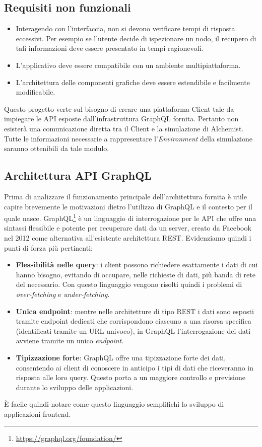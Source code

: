 \subsection{Requisiti non funzionali}
\begin{itemize}
	\item Interagendo con l'interfaccia, non si devono verificare tempi di risposta eccessivi. Per esempio se l'utente decide di ispezionare un nodo, il recupero di tali informazioni deve essere presentato in tempi ragionevoli.
	\item L'applicativo deve essere compatibile con un ambiente multipiattaforma.
	\item L'architettura delle componenti grafiche deve essere estendibile e facilmente modificabile.
\end{itemize}

Questo progetto verte sul bisogno di creare una piattaforma Client tale da impiegare le \ac{API} esposte dall'infrastruttura GraphQL fornita. Pertanto non esisterà una comunicazione diretta tra il Client e la simulazione di Alchemist. Tutte le informazioni necessarie a rappresentare l'\textit{Environment} della simulazione saranno ottenibili da tale modulo.

\subsection{Architettura API GraphQL}
Prima di analizzare il funzionamento principale dell'architettura fornita è utile capire brevemente le motivazioni dietro l'utilizzo di GraphQL e il contesto per il quale nasce. GraphQL\footnote{\url{https://graphql.org/foundation/}} è un linguaggio di interrogazione per le \ac{API} che offre una sintassi flessibile e potente per recuperare dati da un server, creato da Facebook nel 2012 come alternativa all'esistente architettura \ac{REST}. Evidenziamo quindi i punti di forza più pertinenti:
\begin{itemize}
	\item \textbf{Flessibilità nelle query}: i client possono richiedere esattamente i dati di cui hanno bisogno, evitando di occupare, nelle richieste di dati, più banda di rete del necessario. Con questo linguaggio vengono risolti quindi i problemi di \textit{over-fetching} e \textit{under-fetching}.
	\item \textbf{Unica endpoint}:  mentre nelle architetture di tipo \ac{REST} i dati sono esposti tramite endpoint dedicati che corrispondono ciascuno a una risorsa specifica (identificati tramite un \ac{URL} univoco), in GraphQL l'interrogazione dei dati avviene tramite un unico \textit{endpoint}.
	\item \textbf{Tipizzazione forte}: GraphQL offre una tipizzazione forte dei dati, consentendo ai client di conoscere in anticipo i tipi di dati che riceveranno in risposta alle loro query. Questo porta a un maggiore controllo e previsione durante lo sviluppo delle applicazioni.
\end{itemize}
È facile quindi notare come questo linguaggio semplifichi lo sviluppo di applicazioni frontend.

